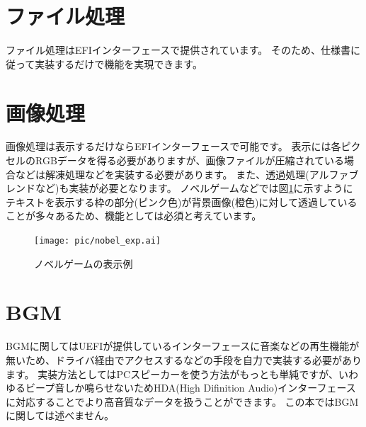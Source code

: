 \documentclass[10pt, b5paper, openany]{ltjsbook}
\begin{document}
\section{ファイル処理}
ファイル処理はEFIインターフェースで提供されています。
そのため、仕様書に従って実装するだけで機能を実現できます。

\section{画像処理}
画像処理は表示するだけならEFIインターフェースで可能です。
表示には各ピクセルのRGBデータを得る必要がありますが、画像ファイルが圧縮されている場合などは解凍処理などを実装する必要があります。
また、透過処理(アルファブレンドなど)も実装が必要となります。
ノベルゲームなどでは図\ref{fig:nobel_exp}に示すようにテキストを表示する枠の部分(ピンク色)が背景画像(橙色)に対して透過していることが多々あるため、機能としては必須と考えています。
\begin{figure}[H]
    \centering
    \texttt{[image: pic/nobel\_exp.ai]}
    \caption{ノベルゲームの表示例}
    \label{fig:nobel_exp}
\end{figure}

\section{BGM}
BGMに関してはUEFIが提供しているインターフェースに音楽などの再生機能が無いため、ドライバ経由でアクセスするなどの手段を自力で実装する必要があります。
実装方法としてはPCスピーカーを使う方法がもっとも単純ですが、いわゆるビープ音しか鳴らせないためHDA(High Difinition Audio)インターフェースに対応することでより高音質なデータを扱うことができます。
この本ではBGMに関しては述べません。
\end{document}
